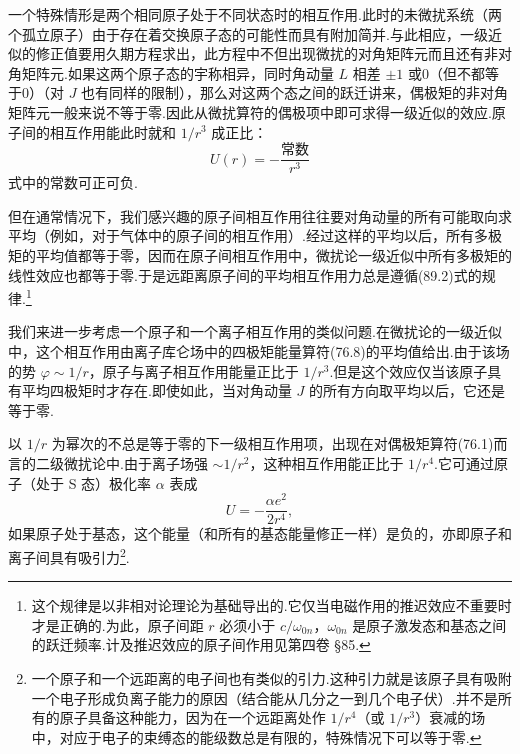 一个特殊情形是两个相同原子处于不同状态时的相互作用.此时的未微扰系统（两个孤立原子）由于存在着交换原子态的可能性而具有附加简并.与此相应，一级近似的修正值要用久期方程求出，此方程中不但出现微扰的对角矩阵元而且还有非对角矩阵元.如果这两个原子态的宇称相异，同时角动量 $L$ 相差 $\pm1$ 或0（但不都等于0）（对 $J$ 也有同样的限制），那么对这两个态之间的跃迁讲来，偶极矩的非对角矩阵元一般来说不等于零.因此从微扰算符的偶极项中即可求得一级近似的效应.原子间的相互作用能此时就和 $1/r^3$ 成正比：
\begin{equation}
  U(r)=-\frac{\text{常数}}{r^3}
\end{equation}
式中的常数可正可负.

但在通常情况下，我们感兴趣的原子间相互作用往往要对角动量的所有可能取向求平均（例如，对于气体中的原子间的相互作用）.经过这样的平均以后，所有多极矩的平均值都等于零，因而在原子间相互作用中，微扰论一级近似中所有多极矩的线性效应也都等于零.于是远距离原子间的平均相互作用力总是遵循(89.2)式的规律.\footnote{这个规律是以非相对论理论为基础导出的.它仅当电磁作用的推迟效应不重要时才是正确的.为此，原子间距 $r$ 必须小于 $c/\omega_{0n}$，$\omega_{0n}$ 是原子激发态和基态之间的跃迁频率.计及推迟效应的原子间作用见第四卷 §85.}

我们来进一步考虑一个原子和一个离子相互作用的类似问题.在微扰论的一级近似中，这个相互作用由离子库仑场中的四极矩能量算符(76.8)的平均值给出.由于该场的势 $\varphi\sim1/r$，原子与离子相互作用能量正比于 $1/r^3$.但是这个效应仅当该原子具有平均四极矩时才存在.即使如此，当对角动量 $J$ 的所有方向取平均以后，它还是等于零.

以 $1/r$ 为幂次的不总是等于零的下一级相互作用项，出现在对偶极矩算符(76.1)而言的二级微扰论中.由于离子场强 $\sim1/r^2$，这种相互作用能正比于 $1/r^4$.它可通过原子（处于 S 态）极化率 $\alpha$ 表成
\begin{equation}
  U=-\frac{\alpha e^2}{2r^4},
\end{equation}
如果原子处于基态，这个能量（和所有的基态能量修正一样）是负的，亦即原子和离子间具有吸引力\footnote{一个原子和一个远距离的电子间也有类似的引力.这种引力就是该原子具有吸附一个电子形成负离子能力的原因（结合能从几分之一到几个电子伏）.并不是所有的原子具备这种能力，因为在一个远距离处作 $1/r^4$（或 $1/r^3$）衰减的场中，对应于电子的束缚态的能级数总是有限的，特殊情况下可以等于零.}.

